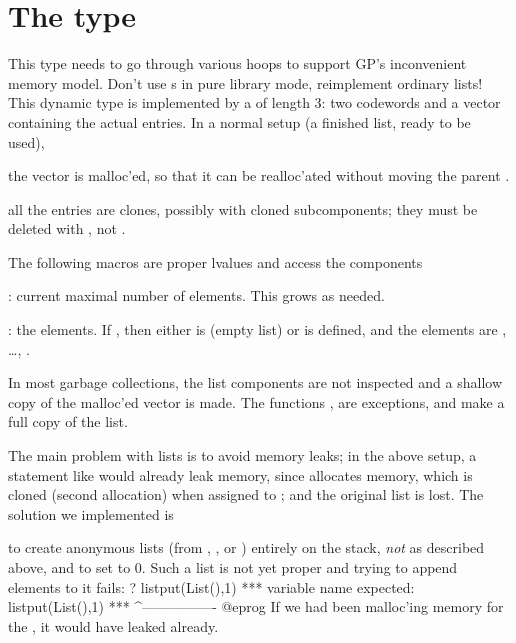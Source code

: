 \section{The type } This type needs to go
through various hoops to support GP's inconvenient memory model. Don't
use s in pure library mode, reimplement ordinary lists! This
dynamic type is implemented by a  of length 3: two codewords and a
vector containing the actual entries. In a normal setup (a finished list,
ready to be used),

\item the vector is malloc'ed, so that it can be realloc'ated without moving
the parent .

\item all the entries are clones, possibly with cloned subcomponents; they
must be deleted with , not .

The following macros are proper lvalues and access the components

: current maximal number of elements. This grows
as needed.

: the elements. If , then
either  is  (empty list) or  is defined, and
the elements are , \dots, .

In most garbage collections, the list components are not inspected
and a shallow copy of the malloc'ed vector is made. The functions
,  are exceptions, and make a full copy of
the list.

The main problem with lists is to avoid memory leaks; in the above setup,
a statement like  would already leak memory, since
 allocates memory, which is cloned (second allocation) when
assigned to ; and the original list is lost. The solution we
implemented is

\item to create anonymous lists (from , ,
 or ) entirely on the stack, \emph{not} as described
above, and to set  to $0$. Such a list is not yet proper and
trying to append elements to it fails:
\bprog
? listput(List(),1)
  ***   variable name expected: listput(List(),1)
  ***                                   ^----------------
@eprog\noindent
If we had been malloc'ing memory for the
, it would have leaked already.

